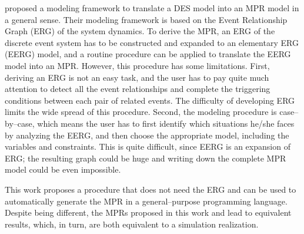 \documentclass[]{interact}
\theoremstyle{plain}%
\theoremstyle{definition}
\theoremstyle{remark}
\begin{document}

\cite{chan2008optimization} proposed a modeling framework to translate a DES model into an MPR model in a general sense. Their modeling framework is based on the Event Relationship Graph (ERG) of the system dynamics. To derive the MPR, %
an ERG of the discrete event system has to be constructed and expanded to an elementary ERG (EERG) model, and a routine procedure can be applied to translate the EERG model into an MPR. %
However, this procedure has some limitations. First, deriving an ERG is not an easy task, and the user has to pay quite much attention to detect all the event relationships and complete the triggering conditions between each pair of related events. %
The difficulty of developing ERG limits the wide spread of this procedure. 
Second, the modeling procedure is case--by--case, which means the user has to first identify which situations he/she faces by analyzing the EERG, and then choose the appropriate model, including the variables and constraints. This is quite %
difficult, since EERG is an expansion of ERG; the resulting graph could be huge and writing down the complete MPR model could be even impossible.  

This work proposes a procedure that does not need %
the ERG and %
can be used to automatically generate the MPR in a general--purpose programming language. Despite %
being different, the MPRs proposed in this work and \cite{chan2008optimization} lead to %
equivalent results, which, in turn, are both equivalent to a simulation realization.
\end{document}
